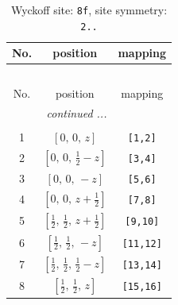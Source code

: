 \documentclass[fleqn,8pt]{jsarticle}
\begin{document}
\begin{longtable}{ccc}
\caption{Wyckoff site: {\tt 8f}, site symmetry: {\tt 2..}}
 \\
 \hline \hline
No. & position & mapping \\ \hline \endfirsthead

\multicolumn{2}{l}{\tablename\ \thetable{}} \\
 \hline \hline
No. & position & mapping \\ \hline \endhead

 \hline \hline
\multicolumn{2}{r}{\footnotesize\it continued ...} \\ \endfoot

 \hline \hline
\multicolumn{2}{r}{} \\ \endlastfoot

1 & $\left[ 0,\, 0,\, z \right]$ & {\tt [1,2]} \\ \hline
2 & $\left[ 0,\, 0,\, \frac{1}{2} - z \right]$ & {\tt [3,4]} \\ \hline
3 & $\left[ 0,\, 0,\, - z \right]$ & {\tt [5,6]} \\ \hline
4 & $\left[ 0,\, 0,\, z + \frac{1}{2} \right]$ & {\tt [7,8]} \\ \hline
5 & $\left[ \frac{1}{2},\, \frac{1}{2},\, z + \frac{1}{2} \right]$ & {\tt [9,10]} \\ \hline
6 & $\left[ \frac{1}{2},\, \frac{1}{2},\, - z \right]$ & {\tt [11,12]} \\ \hline
7 & $\left[ \frac{1}{2},\, \frac{1}{2},\, \frac{1}{2} - z \right]$ & {\tt [13,14]} \\ \hline
8 & $\left[ \frac{1}{2},\, \frac{1}{2},\, z \right]$ & {\tt [15,16]} \\
\end{longtable}
\renewcommand{\arraystretch}{1.2}
\end{document}
